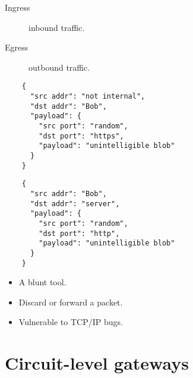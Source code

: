 \begin{frame}
  \begin{definition}
    \begin{description}
      \item[Ingress] inbound traffic.
      \item[Egress] outbound traffic.
    \end{description}
  \end{definition}
\end{frame}

\begin{frame}[fragile]
  \begin{example}
  \begin{verbatim}
    {
      "src addr": "not internal",
      "dst addr": "Bob",
      "payload": {
        "src port": "random",
        "dst port": "https",
        "payload": "unintelligible blob"
      }
    }
  \end{verbatim}
  \end{example}
\end{frame}

\begin{frame}[fragile]
  \begin{example}
  \begin{verbatim}
    {
      "src addr": "Bob",
      "dst addr": "server",
      "payload": {
        "src port": "random",
        "dst port": "http",
        "payload": "unintelligible blob"
      }
    }
  \end{verbatim}
  \end{example}
\end{frame}

\begin{frame}
  \begin{remark}
    \begin{itemize}
      \item A blunt tool.
      \item Discard or forward a packet.
      \item Vulnerable to TCP/IP bugs.
    \end{itemize}
  \end{remark}
\end{frame}


\section[SPI]{Circuit-level gateways}

